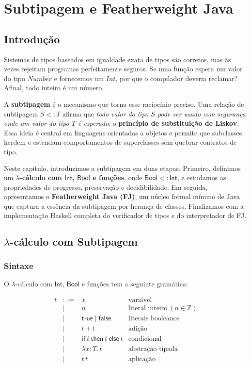\chapter{Subtipagem e Featherweight Java}

\section{Introdução}

Sistemas de tipos baseados em igualdade exata de tipos são corretos,
mas às vezes rejeitam programas perfeitamente seguros. Se uma função
espera um valor do tipo \(\mathit{Number}\) e fornecemos um
\(\mathit{Int}\), por que o compilador deveria reclamar? Afinal, todo
inteiro é um número.

A \textbf{subtipagem} é o mecanismo que torna esse raciocínio
preciso. Uma relação de subtipagem \(S <: T\) afirma que \emph{todo
  valor do tipo \(S\) pode ser usado com segurança onde um valor do
tipo \(T\) é esperado}: o \textbf{princípio de substituição de
Liskov}. Essa ideia é central em linguagens orientadas a objetos e
permite que subclasses herdem e estendam comportamentos de
superclasses sem quebrar contratos de tipo.

Neste capítulo, introduzimos a subtipagem em duas etapas. Primeiro,
definimos um \textbf{$\lambda$-cálculo com \(\mathsf{Int}\),
\(\mathsf{Bool}\) e funções}, onde \(\mathsf{Bool} <: \mathsf{Int}\),
e estudamos as propriedades de progresso, preservação e
decidibilidade. Em seguida, apresentamos o \textbf{Featherweight Java
(FJ)}, um núcleo formal mínimo de Java que captura a essência da
subtipagem por herança de classes. Finalizamos com a implementação
Haskell completa do verificador de tipos e do interpretador de FJ.

\section{$\lambda$-cálculo com Subtipagem}

\subsection{Sintaxe}

O $\lambda$-cálculo com \(\mathsf{Int}\), \(\mathsf{Bool}\) e funções
tem a seguinte gramática:

\[
  \begin{array}{rcll}
    t & ::= & x & \text{variável} \\
      & |   & n & \text{literal inteiro}\ (n \in \mathbb{Z}) \\
      & |   & \mathsf{true} \mid \mathsf{false} & \text{literais booleanos} \\
      & |   & t + t & \text{adição} \\
      & |   & \mathsf{if}\ t\ \mathsf{then}\ t\ \mathsf{else}\ t & \text{condicional} \\
      & |   & \lambda x {:} T.\, t & \text{abstração tipada} \\
      & |   & t\, t & \text{aplicação}
  \end{array}
\]

